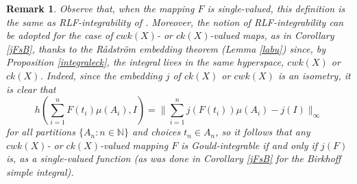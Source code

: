 \documentclass[11pt,a4paper,twoside]{amsart}
\newtheorem{remark}[theorem]{Remark}
\begin{document}
\begin{remark}\rm \label{jFG}
Observe that, when the mapping $F$ is single-valued, this definition is the same as 
{\em RLF-integrability} of \cite[Definition 13]{pot2007}. Moreover, the notion of  RLF-integrability can be adopted for the case of $cwk(X)$- or $ck(X)$-valued maps, 
as in Corollary \ref{jFsB},
thanks to the R{\aa}dstr\"{o}m embedding theorem (Lemma \ref{labu})
since, by Proposition \ref{integraleck},
the integral lives in the same hyperspace, $cwk(X)$ or $ck(X)$. 
Indeed, since the embedding $j$ of $ck(X)$ or $cwk(X)$  is an isometry, it is clear that
$$h(\sum_{i=1}^n F(t_{i})\mu (A_{i}),I)=\|\sum_{i=1}^n j(F(t_{i}))\mu (A_{i})-j(I)\|_{\infty}$$ for all partitions $\{A_n:n\in \mathbb{N}\}$ and choices $t_n\in A_n$, so it follows that any $cwk(X)$- or $ck(X)$-valued mapping $F$ is Gould-integrable if and only if $j(F)$ is, as a single-valued function (as was done in  Corollary \ref{jFsB} for the Birkhoff simple integral).

\end{remark}
\end{document}
